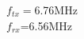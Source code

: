 \documentclass[preview]{standalone}
\begin{document}
\begin{center}
$f_{tx}=$6.76MHz\\$f_{rx}$=6.56MHz
\end{center}
\end{document}
